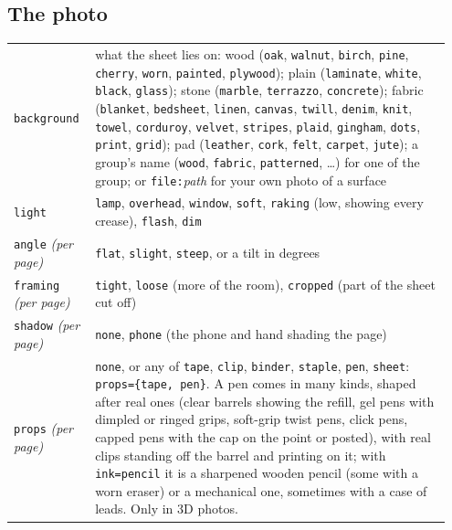 \documentclass[11pt]{article}
\newcommand{\opt}[1]{\texttt{#1}}
\begin{document}
\subsection*{The photo}
\begin{tabular}{@{}p{0.17\linewidth}p{0.78\linewidth}@{}}
\toprule
\opt{background} & what the sheet lies on: wood (\opt{oak}, \opt{walnut}, \opt{birch}, \opt{pine}, \opt{cherry}, \opt{worn}, \opt{painted}, \opt{plywood}); plain (\opt{laminate}, \opt{white}, \opt{black}, \opt{glass}); stone (\opt{marble}, \opt{terrazzo}, \opt{concrete}); fabric (\opt{blanket}, \opt{bedsheet}, \opt{linen}, \opt{canvas}, \opt{twill}, \opt{denim}, \opt{knit}, \opt{towel}, \opt{corduroy}, \opt{velvet}, \opt{stripes}, \opt{plaid}, \opt{gingham}, \opt{dots}, \opt{print}, \opt{grid}); pad (\opt{leather}, \opt{cork}, \opt{felt}, \opt{carpet}, \opt{jute}); a group's name (\opt{wood}, \opt{fabric}, \opt{patterned}, \dots) for one of the group; or \opt{file:}\emph{path} for your own photo of a surface\\
\opt{light} & \opt{lamp}, \opt{overhead}, \opt{window}, \opt{soft}, \opt{raking} (low, showing every crease), \opt{flash}, \opt{dim}\\
\opt{angle} \emph{(per page)} & \opt{flat}, \opt{slight}, \opt{steep}, or a tilt in degrees\\
\opt{framing} \emph{(per page)} & \opt{tight}, \opt{loose} (more of the room), \opt{cropped} (part of the sheet cut off)\\
\opt{shadow} \emph{(per page)} & \opt{none}, \opt{phone} (the phone and hand shading the page)\\
\opt{props} \emph{(per page)} & \opt{none}, or any of \opt{tape}, \opt{clip}, \opt{binder}, \opt{staple}, \opt{pen}, \opt{sheet}: \opt{props=\{tape, pen\}}. A pen comes in many kinds, shaped after real ones (clear barrels showing the refill, gel pens with dimpled or ringed grips, soft-grip twist pens, click pens, capped pens with the cap on the point or posted), with real clips standing off the barrel and printing on it; with \opt{ink=pencil} it is a sharpened wooden pencil (some with a worn eraser) or a mechanical one, sometimes with a case of leads. Only in 3D photos.\\
\bottomrule
\end{tabular}
\end{document}

